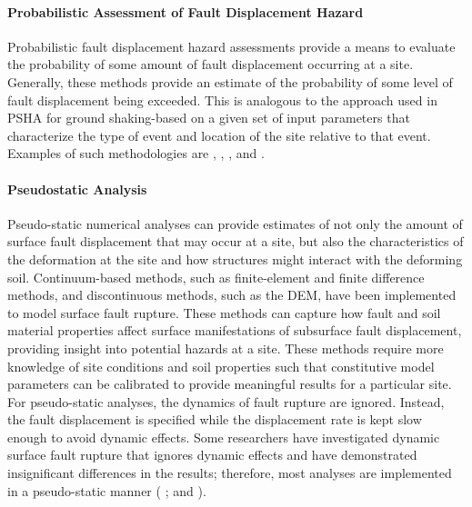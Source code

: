 \paragraph{Probabilistic Assessment of Fault Displacement Hazard}
Probabilistic fault displacement hazard assessments provide a means to evaluate the probability of some amount of fault displacement occurring at a site. Generally, these methods provide an estimate of the probability of some level of fault displacement being exceeded. This is analogous to the approach used in PSHA for ground shaking-based on a given set of input parameters that characterize the type of event and location of the site relative to that event. Examples of such methodologies are \citet{youngs2003methodology}, \citet{petersen2011fault}, \citet{moss2011probabilistic}, and \citet{hecker2013variability}.

\paragraph{Pseudostatic Analysis}
Pseudo-static numerical analyses can provide estimates of not only the amount of surface fault displacement that may occur at a site, but also the characteristics of the deformation at the site and how structures might interact with the deforming soil. Continuum-based methods, such as finite-element and finite difference methods, and discontinuous methods, such as the DEM, have been implemented to model surface fault rupture. These methods can capture how fault and soil material properties affect surface manifestations of subsurface fault displacement, providing insight into potential hazards at a site. These methods require more knowledge of site conditions and soil properties such that constitutive model parameters can be calibrated to provide meaningful results for a particular site. For pseudo-static analyses, the dynamics of fault rupture are ignored. Instead, the fault displacement is specified while the displacement rate is kept slow enough to avoid dynamic effects. Some researchers have investigated dynamic surface fault rupture \citep{oettle2015dynamic} that ignores dynamic effects and have demonstrated insignificant differences in the results; therefore, most analyses are implemented in a pseudo-static manner ( \cite{anastasopoulos2007foundation, anastasopoulos2008numerical, bransby2008centrifuge_reverse, bransby2008centrifuge, oettle2013geotechnical, oettle2017numerical, garcia2018distinct}; and \cite{garcia2018distinct_2}).

